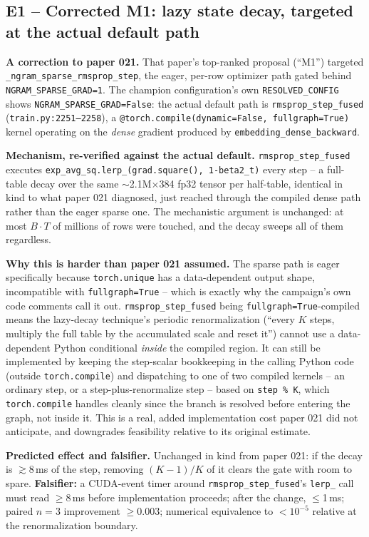 \documentclass{article}
\begin{document}
\subsection{E1 -- Corrected M1: lazy state decay, targeted at the actual default path}
\textbf{A correction to paper 021.} That paper's top-ranked proposal (``M1'') targeted \texttt{\_ngram\_sparse\_rmsprop\_step}, the eager, per-row optimizer path gated behind \texttt{NGRAM\_SPARSE\_GRAD=1}. The champion configuration's own \texttt{RESOLVED\_CONFIG} shows \texttt{NGRAM\_SPARSE\_GRAD=False}: the actual default path is \texttt{rmsprop\_step\_fused} (\texttt{train.py:2251--2258}), a \texttt{@torch.compile(dynamic=False, fullgraph=True)} kernel operating on the \emph{dense} gradient produced by \texttt{embedding\_dense\_backward}.

\textbf{Mechanism, re-verified against the actual default.} \texttt{rmsprop\_step\_fused} executes \texttt{exp\_avg\_sq.lerp\_(grad.square(), 1-beta2\_t)} every step -- a full-table decay over the same $\sim$2.1M$\times$384 fp32 tensor per half-table, identical in kind to what paper 021 diagnosed, just reached through the compiled dense path rather than the eager sparse one. The mechanistic argument is unchanged: at most $B{\cdot}T$ of millions of rows were touched, and the decay sweeps all of them regardless.

\textbf{Why this is harder than paper 021 assumed.} The sparse path is eager specifically because \texttt{torch.unique} has a data-dependent output shape, incompatible with \texttt{fullgraph=True} -- which is exactly why the campaign's own code comments call it out. \texttt{rmsprop\_step\_fused} being \texttt{fullgraph=True}-compiled means the lazy-decay technique's periodic renormalization (``every $K$ steps, multiply the full table by the accumulated scale and reset it'') cannot use a data-dependent Python conditional \emph{inside} the compiled region. It can still be implemented by keeping the step-scalar bookkeeping in the calling Python code (outside \texttt{torch.compile}) and dispatching to one of two compiled kernels -- an ordinary step, or a step-plus-renormalize step -- based on \texttt{step \% K}, which \texttt{torch.compile} handles cleanly since the branch is resolved before entering the graph, not inside it. This is a real, added implementation cost paper 021 did not anticipate, and downgrades feasibility relative to its original estimate.

\textbf{Predicted effect and falsifier.} Unchanged in kind from paper 021: if the decay is $\gtrsim$8\,ms of the step, removing $(K{-}1)/K$ of it clears the gate with room to spare. \textbf{Falsifier:} a CUDA-event timer around \texttt{rmsprop\_step\_fused}'s \texttt{lerp\_} call must read $\ge$8\,ms before implementation proceeds; after the change, $\le$1\,ms; paired $n{=}3$ improvement $\ge 0.003$; numerical equivalence to $<10^{-5}$ relative at the renormalization boundary.
\end{document}
